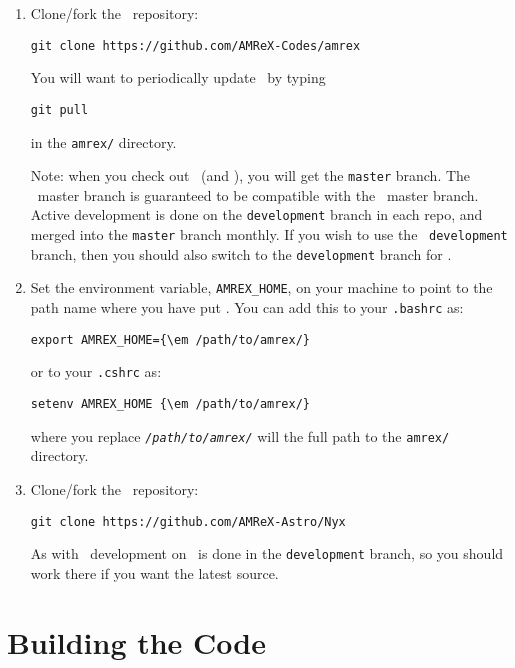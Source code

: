 \begin{enumerate}

\item Clone/fork the \amrex\ repository:
\begin{verbatim}
git clone https://github.com/AMReX-Codes/amrex
\end{verbatim}

You will want to periodically update \amrex\ by typing
\begin{verbatim}
git pull
\end{verbatim}
in the {\tt amrex/} directory.

Note: when you check out \amrex\ (and \nyx), you will get the {\tt master}
branch.   The \nyx\ master branch is guaranteed to be compatible
with the \amrex\ master branch.
Active development is done on the {\tt development} branch
in each repo, and merged into the {\tt master} branch monthly.
If you wish to use the \nyx\ {\tt development} branch, then you
should also switch to the {\tt development} branch for \amrex.

\item Set the environment variable, {\tt AMREX\_HOME}, on your
  machine to point to the path name where you have put \amrex.
  You can add this to your {\tt .bashrc} as:
\begin{Verbatim}[commandchars=\\\{\}]
export AMREX_HOME={\em /path/to/amrex/}
\end{Verbatim}
or to your {\tt .cshrc} as:
\begin{Verbatim}[commandchars=\\\{\}]
setenv AMREX_HOME {\em /path/to/amrex/}
\end{Verbatim}
where you replace \texttt{\em /path/to/amrex/} will the full path to the
{\tt amrex/} directory.

\item Clone/fork the \nyx\ repository:
\begin{verbatim}
git clone https://github.com/AMReX-Astro/Nyx
\end{verbatim}

As with \amrex\, development on \nyx\ is done in the
{\tt development} branch, so you should work there if you want
the latest source.

\end{enumerate}

\section{Building the Code}

